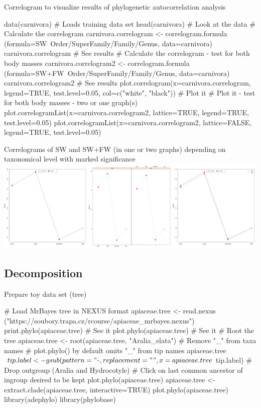 \documentclass[compress, ucs, xelatex, 11pt, xcolor=svgnames,
  hyperref={
    bookmarks=true,
    unicode=true,
    colorlinks=true,
    pdftitle={Molecular data in R},
    plainpages=false,
    pdfauthor={Vojtech Zeisek},
    pdfsubject={Course about phylogeny and evolution in R},
    pdfcreator={XeLaTeX},
    pdfkeywords={R, evolution, phylogeny, molecular data},
    linkcolor=Tomato,
    anchorcolor=SaddleBrown,
    citecolor=Goldenrod,
    filecolor=DarkMagenta,
    menucolor=Sienna,
    urlcolor=DarkTurquoise,
    pdftex},
  url={hyphens, lowtilde} %
  ]{beamer}
\begin{document}
\begin{frame}[fragile]{Correlogram to visualize results of phylogenetic autocorrelation analysis}
  \begin{spluscode}
    data(carnivora) # Loads training data set
    head(carnivora) # Look at the data
    # Calculate the correlogram
    carnivora.correlogram <- correlogram.formula
      (formula=SW~Order/SuperFamily/Family/Genus, data=carnivora)
    carnivora.correlogram # See results
    # Calculate the correlogram - test for both body masses
    carnivora.correlogram2 <- correlogram.formula
      (formula=SW+FW~Order/SuperFamily/Family/Genus, data=carnivora)
    carnivora.correlogram2 # See results
    plot.correlogram(x=carnivora.correlogram, legend=TRUE,
      test.level=0.05, col=c("white", "black")) # Plot it
    # Plot it - test for both body masses - two or one graph(s)
    plot.correlogramList(x=carnivora.correlogram2, lattice=TRUE,
      legend=TRUE, test.level=0.05)
    plot.correlogramList(x=carnivora.correlogram2, lattice=FALSE,
      legend=TRUE, test.level=0.05)
  \end{spluscode}
\end{frame}

\begin{frame}{Correlograms of SW and SW+FW (in one or two graphs) depending on taxonomical level with marked significance}
  \includegraphics[width=\textwidth]{correlog.png}
\end{frame}

\subsection{Decomposition}

\begin{frame}[fragile]{Prepare toy data set (tree)}
  \begin{spluscode}
    # Load MrBayes tree in NEXUS format
    apiaceae.tree <- read.nexus
      ("https://soubory.trapa.cz/rcourse/apiaceae_mrbayes.nexus")
    print.phylo(apiaceae.tree) # See it
    plot.phylo(apiaceae.tree) # See it
    # Root the tree
    apiaceae.tree <- root(apiaceae.tree, "Aralia_elata")
    # Remove "_" from taxa names
    # plot.phylo() by default omits "_" from tip names
    apiaceae.tree$tip.label <- gsub(pattern="_", replacement=" ",
      x=apiaceae.tree$tip.label)
    # Drop outgroup (Aralia and Hydrocotyle)
    # Click on last common ancestor of ingroup desired to be kept
    plot.phylo(apiaceae.tree)
    apiaceae.tree <- extract.clade(apiaceae.tree, interactive=TRUE)
    plot.phylo(apiaceae.tree)
    library(adephylo)
    library(phylobase)
  \end{spluscode}
\end{frame}
\end{document}

